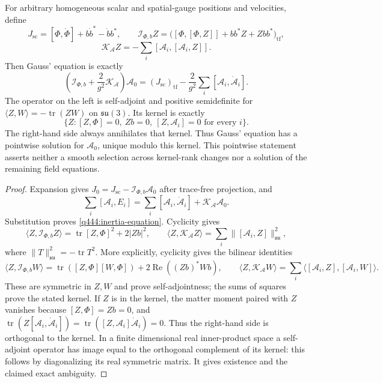 \begin{proposition}
\label{q444:gauss-inertia}
For arbitrary homogeneous scalar and spatial-gauge positions and
velocities, define
\[
 J_{\mathrm{sc}}=
 [\Phi,\dot\Phi]+b\dot b^*-\dot b b^*,\qquad
 \mathscr I_{\Phi,b}Z=
 \bigl([\Phi,[\Phi,Z]]+bb^*Z+Zbb^*\bigr)_{\mathrm{tf}},
\]
\[
 \mathscr K_{\mathcal A}Z
       =-\sum_i[\mathcal A_i,[\mathcal A_i,Z]].
\]
Then Gauss' equation is exactly
\begin{equation}\label{q444:inertia-equation}
 \left(\mathscr I_{\Phi,b}+\frac2{g^2}\mathscr K_{\mathcal A}\right)
 \mathcal A_0
 =(J_{\mathrm{sc}})_{\mathrm{tf}}
       -\frac2{g^2}\sum_i[\mathcal A_i,\dot{\mathcal A}_i].
\end{equation}
The operator on the left is self-adjoint and positive semidefinite for
$\langle Z,W\rangle=-\operatorname{tr}(ZW)$ on $\mathfrak{su}(3)$.
Its kernel is exactly
\[
 \{Z:[Z,\Phi]=0,\ Zb=0,\ [Z,\mathcal A_i]=0\text{ for every }i\}.
\]
The right-hand side always annihilates that kernel. Thus Gauss' equation
has a pointwise solution for $\mathcal A_0$, unique modulo this kernel.
This pointwise statement asserts neither a smooth selection across
kernel-rank changes nor a solution of the remaining field equations.
\end{proposition}
\begin{proof}
Expansion gives
$J_0=J_{\mathrm{sc}}-\mathscr I_{\Phi,b}\mathcal A_0$
after trace-free projection, and
\[
 \sum_i[\mathcal A_i,E_i]
 =\sum_i[\mathcal A_i,\dot{\mathcal A}_i]
          +\mathscr K_{\mathcal A}\mathcal A_0.
\]
Substitution proves \eqref{q444:inertia-equation}. Cyclicity gives
\[
 \langle Z,\mathscr I_{\Phi,b}Z\rangle
       =\operatorname{tr}[Z,\Phi]^2+2|Zb|^2,\qquad
 \langle Z,\mathscr K_{\mathcal A}Z\rangle
       =\sum_i\|[\mathcal A_i,Z]\|_{\mathfrak{su}}^2,
\]
where $\|T\|_{\mathfrak{su}}^2=-\operatorname{tr}T^2$.
More explicitly, cyclicity gives the bilinear identities
\[
 \langle Z,\mathscr I_{\Phi,b}W\rangle
 =\operatorname{tr}([Z,\Phi][W,\Phi])
                  +2\operatorname{Re}((Zb)^*Wb),\qquad
 \langle Z,\mathscr K_{\mathcal A}W\rangle
 =\sum_i\langle[\mathcal A_i,Z],[\mathcal A_i,W]\rangle.
\]
These are symmetric in $Z,W$ and prove self-adjointness; the sums of
squares prove the stated kernel. If $Z$ is in the kernel, the matter moment
paired with $Z$ vanishes because $[Z,\Phi]=Zb=0$, and
$\operatorname{tr}(Z[\mathcal A_i,\dot{\mathcal A}_i])
=\operatorname{tr}([Z,\mathcal A_i]\dot{\mathcal A}_i)=0$.
Thus the right-hand side is orthogonal to the kernel. In a finite
dimensional real inner-product space a self-adjoint operator has image
equal to the orthogonal complement of its kernel: this follows by
diagonalizing its real symmetric matrix. It gives existence and the
claimed exact ambiguity.
\end{proof}

